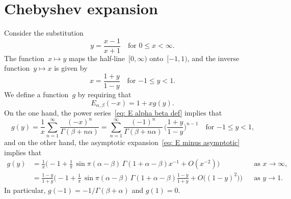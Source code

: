 \documentclass[12pt,a4paper]{article}
\begin{document}
\section{Chebyshev expansion}
Consider the substitution
\[
y=\frac{x-1}{x+1}\quad\text{for $0\le x<\infty$.}
\]
The function~$x\mapsto y$ maps the half-line~$[0,\infty)$ onto~$[-1,1)$, and 
the inverse function~$y\mapsto x$ is given by
\[
x=\frac{1+y}{1-y}\quad\text{for $-1\le y<1$.}
\]
We define a function~$g$ by requiring that
\[
E_{\alpha,\beta}(-x)=1+xg(y).
\]
On the one hand, the power series~\eqref{eq: E alpha beta def} implies that
\[
g(y)=\frac{1}{x}\sum_{n=1}^\infty\frac{(-x)^n}{\Gamma(\beta+n\alpha)}
    =\sum_{n=1}^\infty\frac{(-1)^n}{\Gamma(\beta+n\alpha)}\,\biggl(
    \frac{1+y}{1-y}\biggr)^{n-1}\quad\text{for $-1\le y<1$,}
\]
and on the other hand, the asymptotic expansion~\eqref{eq: E minus asymptotic}
implies that
\begin{align*}
g(y)&=\frac{1}{x}\biggl(-1+\frac{1}{\pi}\,\sin\pi(\alpha-\beta)\,
    \Gamma(1+\alpha-\beta)x^{-1}+O(x^{-2})\biggr)&
&\text{as $x\to\infty$,}\\
    &=\frac{1-y}{1+y}\biggl(-1+\frac{1}{\pi}\,\sin\pi(\alpha-\beta)\,
\Gamma(1+\alpha-\beta)\frac{1-y}{1+y}+O\bigl((1-y)^2\bigr)\biggr)&
&\text{as $y\to1$.}
\end{align*}
In particular, $g(-1)=-1/\Gamma(\beta+\alpha)$ and $g(1)=0$.






\printbibliography
\end{document}

